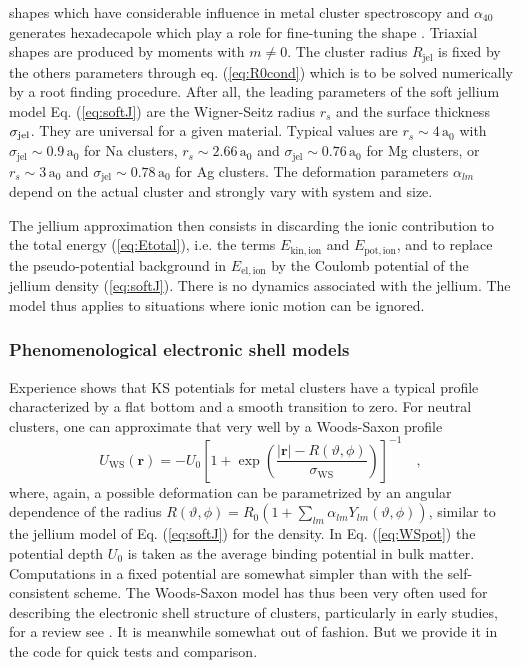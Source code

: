 \documentclass[final,1p]{elsarticle}
\begin{document}
shapes which have considerable influence in metal cluster spectroscopy
and $\alpha_{40}$ generates hexadecapole which play a role for
fine-tuning the shape \cite{Mon95b}.  Triaxial shapes are produced by
moments with $m\neq 0$. The cluster radius $R_\mathrm{jel}$ is fixed by
the others parameters through eq. (\ref{eq:R0cond}) which is to be
solved numerically by a root finding procedure.  After all, the
leading parameters of the soft jellium model Eq. (\ref{eq:softJ}) are
the Wigner-Seitz radius $r_s$ and the surface thickness $\sigma_{\rm
  jel}$.  They are universal for a given material. Typical values are
$r_s\sim 4\,\mathrm{a}_0$ with $\sigma_\mathrm{jel}\sim
0.9\,\mathrm{a}_0$ for Na clusters, $r_s\sim 2.66\,\mathrm{a}_0$ and
$\sigma_\mathrm{jel}\sim 0.76\,\mathrm{a}_0$ for {Mg clusters}, or
$r_s\sim 3\,\mathrm{a}_0$ and $\sigma_\mathrm{jel}\sim
0.78\,\mathrm{a}_0$ for Ag clusters. The deformation parameters
$\alpha_{lm}$ depend on the actual cluster and strongly vary with
system and size.


The jellium approximation then consists in discarding the ionic
contribution to the total energy (\ref{eq:Etotal}), i.e. the terms
$E_\mathrm{kin,ion}$ and $E_\mathrm{pot,ion}$, and to replace the
pseudo-potential background in $E_\mathrm{el,ion}$ by the Coulomb
potential of the jellium density (\ref{eq:softJ}). There is no
dynamics associated with the jellium. The model thus applies to
situations where ionic motion can be ignored.



\subsubsection{Phenomenological electronic shell models}
\label{eq:phenshell}

Experience shows that KS potentials for metal clusters have a typical
profile characterized by a flat bottom and a smooth transition to
zero. For neutral clusters, one can approximate that very well by a
Woods-Saxon profile
\begin{equation}
  U_\mathrm{WS}(\mathbf{r})
  =
  -U_0
  \left[1+
     \exp\left(\frac{|\mathbf{r}|-R(\vartheta,\phi)}
                    {\sigma_\mathrm{WS}}\right)
  \right]^{-1}
  \quad,
\label{eq:WSpot}
\end{equation}
where, again, a possible deformation can be parametrized by an angular
dependence of the radius
%
$R(\vartheta,\phi)=
R_0\left(1\!+\!\sum_{lm}\alpha_{lm}Y_{lm}(\vartheta,\phi)\right)$,
%
similar to the jellium model of Eq. (\ref{eq:softJ}) for the density.
In Eq. (\ref{eq:WSpot}) the potential depth $U_0$ is taken as the
average binding potential in bulk matter. Computations in a fixed
potential are somewhat simpler than with the self-consistent
scheme. The Woods-Saxon model has thus been very often used for
describing the electronic shell structure of clusters, particularly in
early studies, for a review see \cite{Bra93}. It is meanwhile somewhat
out of fashion. But we provide it in the code for quick tests and
comparison.
\end{document}
